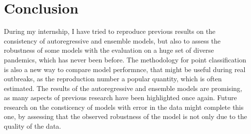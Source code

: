 \section*{Conclusion}


During my internship, I have tried to reproduce previous results on the consistency of autoregressive and ensemble models, but also to assess the robustness of some models with the evaluation on a huge set of diverse pandemics, which has never been before. 
The methodology for point classification is also a new way to compare model performnce, that might be useful during real outbreaks, as the reproduction number a popular quantity, which is often estimated. 
The results of the autoregressive and ensemble models are promising, as many aspects of previous research have been highlighted once again.
Future research on the consticency of models with error in the data might complete this one, by assessing that the observed robustness of the model is not only due to the quality of the data.

